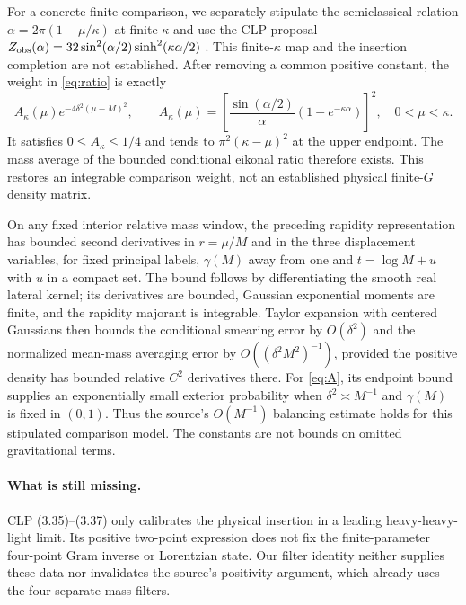 \documentclass[11pt,a4paper]{article}
\begin{document}
For a concrete finite comparison, we separately stipulate the
semiclassical relation $\alpha=2\pi(1-\mu/\kappa)$ at finite $\kappa$
and use the CLP proposal
$Z_{\rm obs}(\alpha)=32\sin^2(\alpha/2)\sinh^2(\kappa\alpha/2)$
\cite{clp}. This finite-$\kappa$ map and the insertion completion
are not established. After removing a common positive constant,
the weight in \eqref{eq:ratio} is exactly
\begin{equation}
 A_\kappa(\mu)e^{-4\delta^2(\mu-M)^2},\qquad
 A_\kappa(\mu)=
 \left[\frac{\sin(\alpha/2)}{\alpha}
 (1-e^{-\kappa\alpha})\right]^2,\quad0<\mu<\kappa.
 \label{eq:A}
\end{equation}
It satisfies $0\leq A_\kappa\leq1/4$ and tends to
$\pi^2(\kappa-\mu)^2$ at the upper endpoint.
The mass average of the bounded conditional eikonal ratio therefore
exists. This restores an integrable comparison weight, not an
established physical finite-$G$ density matrix.

On any fixed interior relative mass window, the preceding
rapidity representation has bounded second derivatives in
$r=\mu/M$ and in the three displacement variables, for fixed
principal labels, $\gamma(M)$ away from one and $t=\log M+u$
with $u$ in a compact set. The bound follows by differentiating
the smooth real lateral kernel; its derivatives are bounded,
Gaussian exponential moments are finite, and the rapidity
majorant is integrable. Taylor expansion with centered Gaussians
then bounds the conditional smearing error by $O(\delta^2)$
and the normalized mean-mass averaging error by
$O((\delta^2 M^2)^{-1})$, provided the positive density has bounded
relative $C^2$ derivatives there. For \eqref{eq:A}, its endpoint
bound supplies an exponentially small exterior probability when
$\delta^2\asymp M^{-1}$ and $\gamma(M)$ is fixed in $(0,1)$.
Thus the source's $O(M^{-1})$ balancing estimate holds for this
stipulated comparison model. The constants are not bounds on
omitted gravitational terms.

\paragraph{What is still missing.}
CLP (3.35)--(3.37) only calibrates the physical insertion in a
leading heavy-heavy-light limit. Its positive two-point expression
does not fix the finite-parameter four-point Gram inverse or
Lorentzian state. Our filter identity neither supplies these data
nor invalidates the source's positivity argument, which already
uses the four separate mass filters.
\end{document}
